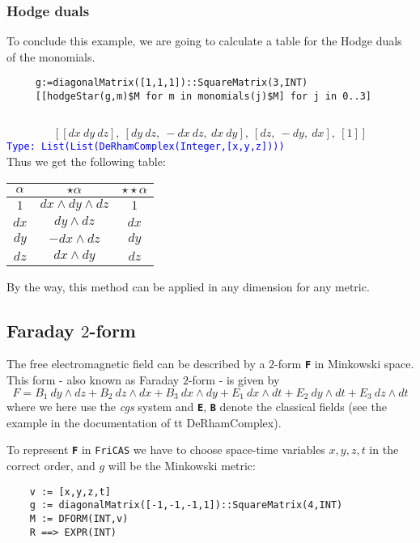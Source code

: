 \documentclass[12pt,a4paper]{article}
\newcommand{\spadbold}[1]{{\tt\bf #1}}
\newcommand{\type}[1]{\textcolor{blue}{\tt\tiny #1}}
\begin{document}
\subsubsection{Hodge duals}
To conclude this example, we are going to calculate a table for the Hodge
duals of the monomials.
\begin{lstlisting}
     g:=diagonalMatrix([1,1,1])::SquareMatrix(3,INT) 
     [[hodgeStar(g,m)$M for m in monomials(j)$M] for j in 0..3]
     
\end{lstlisting}
\begin{displaymath}
   \left[{\left[ {dx \  dy \  dz}\right]},
   \: {\left[ {dy \  dz}, \: -{dx \  dz}, \: {dx \  dy}\right]},
   \: {\left[ dz, \: -dy, \: dx\right]},\: {\left[ 1\right]}\right]
\end{displaymath}
\type{Type: List(List(DeRhamComplex(Integer,[x,y,z])))}
\\
Thus we get the following table:
\begin{center}
\begin{tabular}{|c|c|c|}
\hline 
$\alpha$ & $\star\alpha$ & $\star\star\alpha$ \\ 
\hline 
$1$ & $dx\wedge dy \wedge dz$ & $1$ \\ 
\hline 
$dx$ & $dy \wedge dz$ & $dx$ \\ 
\hline 
$dy$ & $-dx \wedge dz$ & $dy$ \\ 
\hline 
$dz$ & $dx \wedge dy$ & $dz$ \\ 
\hline 
\end{tabular} 
\end{center}
By the way, this method can be applied in any dimension for any metric.
%
\subsection{Faraday $2$-form} 
The free electromagnetic field can be described by a $2$-form 
\spadbold{F} in Minkowski space. This form - also known as Faraday $2$-form - 
is given by
\begin{displaymath}
   F=B_1\ dy\wedge dz + B_2\ dz\wedge dx + B_3\ dx\wedge dy +
     E_1\ dx\wedge dt + E_2\ dy\wedge dt + E_3\ dz\wedge dt 
\end{displaymath}
where we here use the {\it cgs} system and \spadbold{E},
\spadbold{B} denote the classical fields (see the example in the 
documentation of {tt DeRhamComplex}).

To represent \spadbold{F} in {\tt FriCAS} we have to choose space-time 
variables $x,y,z,t$ in the correct order, and $g$ will be the 
Minkowski metric:
\begin{lstlisting}    
    v := [x,y,z,t]   
    g := diagonalMatrix([-1,-1,-1,1])::SquareMatrix(4,INT)   
    M := DFORM(INT,v)    
    R ==> EXPR(INT)  
\end{lstlisting}
\end{document}
